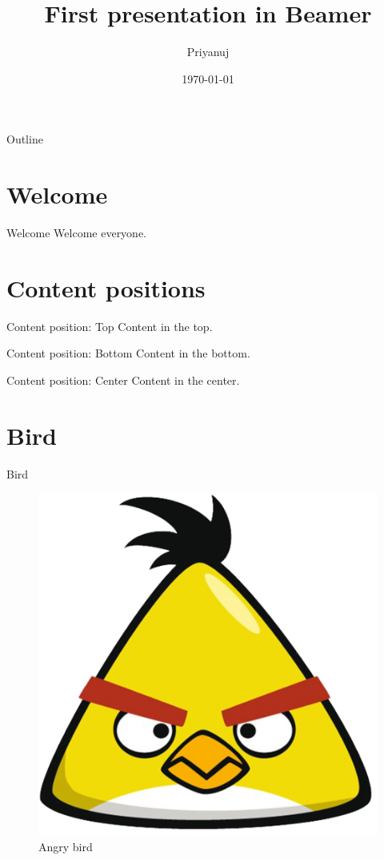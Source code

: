 \documentclass{beamer}
\title{First presentation in Beamer}
\author{Priyanuj}
\date{\today}
\begin{document}
	\begin{frame}
		\maketitle
	\end{frame}

	\begin{frame}{Outline}
		\tableofcontents
	\end{frame}

	\section{Welcome}
	\begin{frame}{Welcome}
		Welcome everyone.
	\end{frame}
	
	\section{Content positions}
	\begin{frame}[t]{Content position: Top}
		Content in the top.
	\end{frame}

	\begin{frame}[b]{Content position: Bottom}
		Content in the bottom.
	\end{frame}

	\begin{frame}{Content position: Center}
		Content in the center.
	\end{frame}

	\section{Bird}
	\begin{frame}{Bird}
		\begin{figure}
			\centering
			\includegraphics[scale=0.1]{bird.png}
			\caption{Angry bird}
		\end{figure}
	\end{frame}
\end{document}
